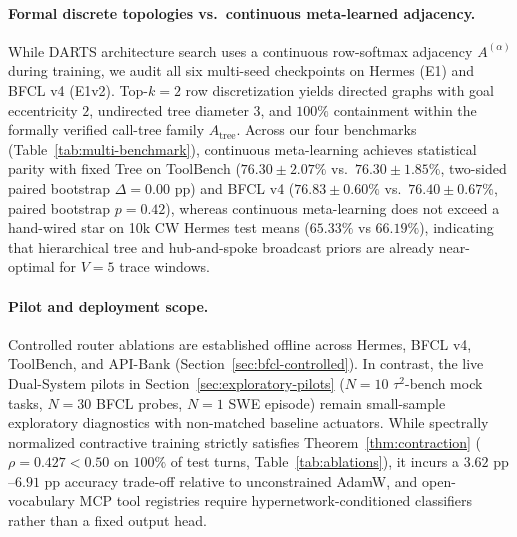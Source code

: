\documentclass[10pt,twocolumn,letterpaper]{article}
\begin{document}
\paragraph{Formal discrete topologies vs.\ continuous meta-learned adjacency.}
While DARTS architecture search uses a continuous row-softmax adjacency $A^{(\alpha)}$ during training, we audit all six multi-seed checkpoints on Hermes (E1) and BFCL v4 (E1v2). Top-$k=2$ row discretization yields directed graphs with goal eccentricity $2$, undirected tree diameter $3$, and $100\%$ containment within the formally verified call-tree family $A_{\text{tree}}$. Across our four benchmarks (Table~\ref{tab:multi-benchmark}), continuous meta-learning achieves statistical parity with fixed Tree on ToolBench ($76.30 \pm 2.07\%$ vs.\ $76.30 \pm 1.85\%$, two-sided paired bootstrap $\Delta = 0.00\text{ pp}$) and BFCL v4 ($76.83 \pm 0.60\%$ vs.\ $76.40 \pm 0.67\%$, paired bootstrap $p = 0.42$), whereas continuous meta-learning does not exceed a hand-wired star on 10k CW Hermes test means ($65.33\%$ vs $66.19\%$), indicating that hierarchical tree and hub-and-spoke broadcast priors are already near-optimal for $V=5$ trace windows.

\paragraph{Pilot and deployment scope.}
Controlled router ablations are established offline across Hermes, BFCL v4, ToolBench, and API-Bank (Section~\ref{sec:bfcl-controlled}). In contrast, the live Dual-System pilots in Section~\ref{sec:exploratory-pilots} ($N=10$ $\tau^2$-bench mock tasks, $N=30$ BFCL probes, $N=1$ SWE episode) remain small-sample exploratory diagnostics with non-matched baseline actuators. While spectrally normalized contractive training strictly satisfies Theorem~\ref{thm:contraction} ($\rho = 0.427 < 0.50$ on $100\%$ of test turns, Table~\ref{tab:ablations}), it incurs a $3.62\text{ pp}$--$6.91\text{ pp}$ accuracy trade-off relative to unconstrained AdamW, and open-vocabulary MCP tool registries require hypernetwork-conditioned classifiers rather than a fixed output head.
\end{document}
